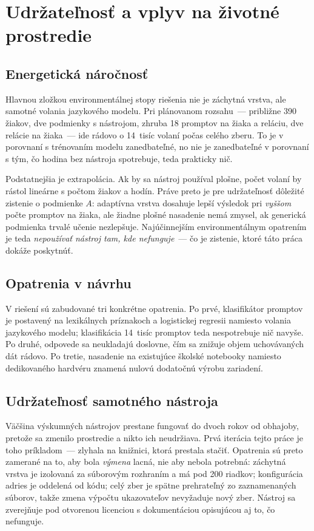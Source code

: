 \section{Udržateľnosť a vplyv na životné prostredie}
\label{sec:udrzatelnost}

\subsection{Energetická náročnosť}

Hlavnou zložkou environmentálnej stopy riešenia nie je záchytná vrstva, ale samotné volania jazykového modelu. Pri plánovanom rozsahu~--- približne 390 žiakov, dve podmienky s nástrojom, zhruba 18 promptov na žiaka a reláciu, dve relácie na žiaka~--- ide rádovo o 14~tisíc volaní počas celého zberu. To je v porovnaní s trénovaním modelu zanedbateľné, no nie je zanedbateľné v porovnaní s tým, čo hodina bez nástroja spotrebuje, teda prakticky nič.

Podstatnejšia je extrapolácia. Ak by sa nástroj používal plošne, počet volaní by rástol lineárne s počtom žiakov a hodín. Práve preto je pre udržateľnosť dôležité zistenie o podmienke $A$: adaptívna vrstva dosahuje lepší výsledok pri \emph{vyššom} počte promptov na žiaka, ale žiadne plošné nasadenie nemá zmysel, ak generická podmienka trvalé učenie nezlepšuje. Najúčinnejším environmentálnym opatrením je teda \emph{nepoužívať nástroj tam, kde nefunguje}~--- čo je zistenie, ktoré táto práca dokáže poskytnúť.

\subsection{Opatrenia v návrhu}

V riešení sú zabudované tri konkrétne opatrenia. Po prvé, klasifikátor promptov je postavený na lexikálnych príznakoch a logistickej regresii namiesto volania jazykového modelu; klasifikácia 14~tisíc promptov teda nespotrebuje nič navyše. Po druhé, odpovede sa neukladajú doslovne, čím sa znižuje objem uchovávaných dát rádovo. Po tretie, nasadenie na existujúce školské notebooky namiesto dedikovaného hardvéru znamená nulovú dodatočnú výrobu zariadení.

\subsection{Udržateľnosť samotného nástroja}

Väčšina výskumných nástrojov prestane fungovať do dvoch rokov od obhajoby, pretože sa zmenilo prostredie a nikto ich neudržiava. Prvá iterácia tejto práce je toho príkladom~--- zlyhala na knižnici, ktorá prestala stačiť. Opatrenia sú preto zamerané na to, aby bola \emph{výmena} lacná, nie aby nebola potrebná: záchytná vrstva je izolovaná za súborovým rozhraním a má pod 200 riadkov; konfigurácia adries je oddelená od kódu; celý zber je spätne prehrateľný zo zaznamenaných súborov, takže zmena výpočtu ukazovateľov nevyžaduje nový zber. Nástroj sa zverejňuje pod otvorenou licenciou s dokumentáciou opisujúcou aj to, čo nefunguje.


